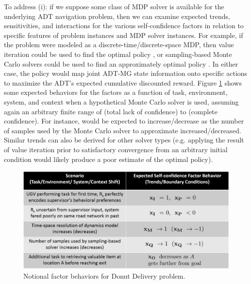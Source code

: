 To address (i): if we suppose some class of MDP solver is available for the underlying ADT navigation problem, then we can examine expected trends, sensitivities, and interactions for the various self-confidence factors in relation to specific features of problem instances and MDP solver instances. 
For example, if the problem were modeled  as a discrete-time/discrete-space MDP, then value iteration could be used to find the optimal policy \policyopt, or sampling-based Monte Carlo solvers could be used to find an approximately optimal policy \policy{}  \cite{Browne2012-fo}. In either case, the policy would map joint ADT-MG state information onto specific actions to maximize the ADT's expected cumulative discounted reward.  
Figure \ref{fig:trendsBCs} shows some expected behaviors for the \famsec{} factors as a function of task, environment, system, and context when a hypothetical Monte Carlo solver is used, assuming again an arbitrary finite range of \flow{} (total lack of confidence) to \fup{} (complete confidence). For instance, \xQ{} would be expected to increase/decrease as the number of samples used by the Monte Carlo solver to approximate \policyopt{} increased/decreased. Similar trends can also be derived for other solver types (e.g. applying the result of value iteration prior to satisfactory convergence from an arbitrary initial condition would likely produce a poor estimate of the optimal policy). %
\begin{figure}[tbp]
    \centering
    \includegraphics[width=0.65\linewidth]{Figures/scTrendsBoundaryExample_2generic.png}
    \caption{Notional \famsec{} factor behaviors for Donut Delivery problem.  }
    \label{fig:trendsBCs}
    \vspace{-0.5 cm}
\end{figure}

